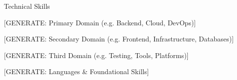 \documentclass{resume}
\begin{document}
\begin{rSection}{Technical Skills}

\begin{skillgroup}{[GENERATE: Primary Domain (e.g. Backend, Cloud, DevOps)]}
\skilldash{[GENERATE]}
\skilldash{[GENERATE]}
\skilldash{[GENERATE]}
\end{skillgroup}

\begin{skillgroup}{[GENERATE: Secondary Domain (e.g. Frontend, Infrastructure, Databases)]}
\skilldash{[GENERATE]}
\skilldash{[GENERATE]}
\skilldash{[GENERATE]}
\end{skillgroup}

\begin{skillgroup}{[GENERATE: Third Domain (e.g. Testing, Tools, Platforms)]}
\skilldash{[GENERATE]}
\skilldash{[GENERATE]}
\end{skillgroup}

\begin{skillgroup}{[GENERATE: Languages \& Foundational Skills]}
\skilldash{[GENERATE]}
\skilldash{[GENERATE]}
\end{skillgroup}

\end{rSection}
\vspace{-0.15cm}
\end{document}
